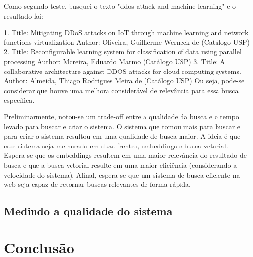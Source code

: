 \documentclass[
	12pt,				%
	openright,			%
	oneside,			%
	a4paper,			%
	english,			%
	french,				%
	spanish,			%
	brazil				%
	]{abntex2}
\begin{document}
Como segundo teste, busquei o texto "ddos attack and machine learning" e o resultado foi:

1. Title:  Mitigating DDoS attacks on IoT through machine learning and network functions virtualization
Author:  Oliveira, Guilherme Werneck de (Catálogo USP)
2. Title:  Reconfigurable learning system for classification of data using parallel processing
Author:  Moreira, Eduardo Marmo (Catálogo USP)
3. Title:  A collaborative architecture against DDOS attacks for cloud computing systems.
Author:  Almeida, Thiago Rodrigues Meira de (Catálogo USP)
Ou seja, pode-se considerar que houve uma melhora considerável de relevância para essa busca específica.

Preliminarmente, notou-se um trade-off entre a qualidade da busca e o tempo levado para buscar e criar o sistema. O sistema que tomou mais para buscar e para criar o sistema resultou em uma qualidade de busca maior. A ideia é que esse sistema seja melhorado em duas frentes, embeddings e busca vetorial. Espera-se que os embeddings resultem em uma maior relevância do resultado de busca e que a busca vetorial resulte em uma maior eficiência (considerando a velocidade do sistema). Afinal, espera-se que um sistema de busca eficiente na web seja capaz de retornar buscas relevantes de forma rápida.



\section{Medindo a qualidade do sistema}

\chapter*[Conclusão]{Conclusão}


\postextual



%
%
\end{document}
